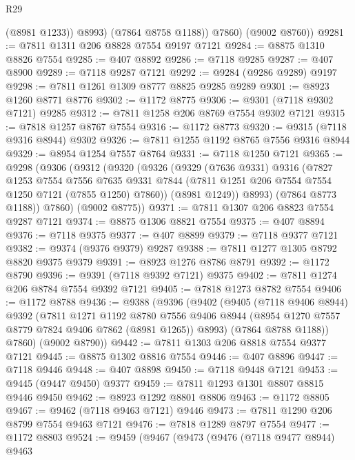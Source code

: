 \begin{lexlean}{R29}
\begin{coremodule}
              (@8981 @1233))
            @8993)
          (@7864 @8758 @1188))
        @7860)
      (@9002 @8760))
@9281 := @7811 @1311 @206 @8828 @7554 @9197 @7121
@9284 := @8875 @1310 @8826 @7554
@9285 := @407 @8892
@9286 := @7118 @9285
@9287 := @407 @8900
@9289 := @7118 @9287 @7121
@9292 := @9284 (@9286 @9289) @9197
@9298 := @7811 @1261 @1309 @8777 @8825 @9285 @9289
@9301 := @8923 @1260 @8771 @8776
@9302 := @1172 @8775
@9306 := @9301 (@7118 @9302 @7121) @9285
@9312 := @7811 @1258 @206 @8769 @7554 @9302 @7121
@9315 := @7818 @1257 @8767 @7554
@9316 := @1172 @8773
@9320 := @9315 (@7118 @9316 @8944) @9302
@9326 := @7811 @1255 @1192 @8765 @7556 @9316 @8944
@9329 := @8954 @1254 @7557 @8764
@9331 := @7118 @1250 @7121
@9365 := @9298
    (@9306
      (@9312
        (@9320
          (@9326
            (@9329
              (@7636 @9331)
              @9316
              (@7827
                @1253
                @7554
                @7556
                @7635
                @9331
                @7844
                (@7811 @1251 @206 @7554 @7554 @1250 @7121 (@7855 @1250) @7860))
              (@8981 @1249))
            @8993)
          (@7864 @8773 @1188))
        @7860)
      (@9002 @8775))
@9371 := @7811 @1307 @206 @8823 @7554 @9287 @7121
@9374 := @8875 @1306 @8821 @7554
@9375 := @407 @8894
@9376 := @7118 @9375
@9377 := @407 @8899
@9379 := @7118 @9377 @7121
@9382 := @9374 (@9376 @9379) @9287
@9388 := @7811 @1277 @1305 @8792 @8820 @9375 @9379
@9391 := @8923 @1276 @8786 @8791
@9392 := @1172 @8790
@9396 := @9391 (@7118 @9392 @7121) @9375
@9402 := @7811 @1274 @206 @8784 @7554 @9392 @7121
@9405 := @7818 @1273 @8782 @7554
@9406 := @1172 @8788
@9436 := @9388
    (@9396
      (@9402
        (@9405
          (@7118 @9406 @8944)
          @9392
          (@7811
            @1271
            @1192
            @8780
            @7556
            @9406
            @8944
            (@8954 @1270 @7557 @8779 @7824 @9406 @7862 (@8981 @1265))
            @8993)
          (@7864 @8788 @1188))
        @7860)
      (@9002 @8790))
@9442 := @7811 @1303 @206 @8818 @7554 @9377 @7121
@9445 := @8875 @1302 @8816 @7554
@9446 := @407 @8896
@9447 := @7118 @9446
@9448 := @407 @8898
@9450 := @7118 @9448 @7121
@9453 := @9445 (@9447 @9450) @9377
@9459 := @7811 @1293 @1301 @8807 @8815 @9446 @9450
@9462 := @8923 @1292 @8801 @8806
@9463 := @1172 @8805
@9467 := @9462 (@7118 @9463 @7121) @9446
@9473 := @7811 @1290 @206 @8799 @7554 @9463 @7121
@9476 := @7818 @1289 @8797 @7554
@9477 := @1172 @8803
@9524 := @9459
    (@9467
      (@9473
        (@9476
          (@7118 @9477 @8944)
          @9463

\end{coremodule}
\end{lexlean}
